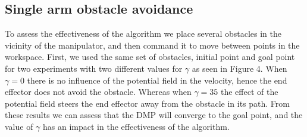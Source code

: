 \documentclass[a4paper, 11.5pt, conference]{ieeeconf}      %
\begin{document}
\subsection{Single arm obstacle avoidance} %
 To assess the effectiveness of the algorithm we place several obstacles in the vicinity of the manipulator, and then command it to move between points in the workspace. First, we used the same set of obstacles, initial point and goal point for two experiments with two different values for $\gamma$ as seen in Figure 4. When $\gamma=0$ there is no influence of the potential field in the velocity, hence the end effector does not avoid the obstacle. Whereas when $\gamma=35$ the effect of the potential field steers the end effector away from the obstacle in its path. From these results we can assess that the DMP will converge to the goal point, and the value of $\gamma$ has an impact in the effectiveness of the algorithm. 
\end{document}
